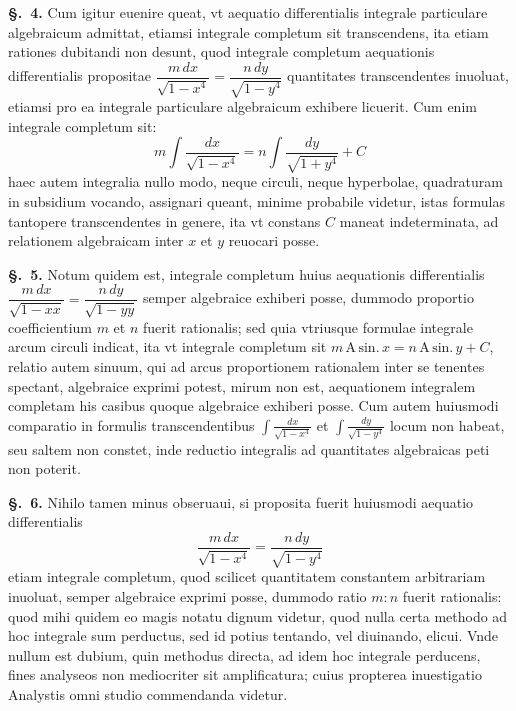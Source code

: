 \documentclass{article}
\begin{document}
\textbf{§.~4.} Cum igitur euenire queat, vt aequatio differentialis integrale particulare
algebraicum admittat, etiamsi integrale completum sit transcendens, ita etiam rationes dubitandi
non desunt, quod integrale completum aequationis differentialis propositae
$\dfrac{m\,dx}{\sqrt{1-x^{4}}} = \dfrac{n\,dy}{\sqrt{1-y^{4}}}$ quantitates transcendentes inuoluat,
etiamsi pro ea integrale particulare algebraicum exhibere licuerit. Cum enim integrale completum
sit:
\[ m\int \frac{dx}{\sqrt{1-x^{4}}} = n\int \frac{dy}{\sqrt{1+y^{4}}} + C \]
haec autem integralia nullo modo, neque circuli, neque hyperbolae, quadraturam in subsidium
vocando, assignari queant, minime probabile videtur, istas formulas tantopere transcendentes in
genere, ita vt constans $C$ maneat indeterminata, ad relationem algebraicam inter $x$ et $y$
reuocari posse.

\textbf{§.~5.} Notum quidem est, integrale completum huius aequationis differentialis
$\dfrac{m\,dx}{\sqrt{1-xx}} = \dfrac{n\,dy}{\sqrt{1-yy}}$ semper algebraice exhiberi posse, dummodo
proportio coefficientium $m$ et $n$ fuerit rationalis; sed quia vtriusque formulae integrale arcum
circuli indicat, ita vt integrale completum sit
$m\,\mathrm{A}\,\mathrm{sin.}\,x = n\,\mathrm{A}\,\mathrm{sin.}\,y + C$, relatio autem sinuum, qui ad
arcus proportionem rationalem inter se tenentes spectant, algebraice exprimi potest, mirum non est,
aequationem integralem completam his casibus quoque algebraice exhiberi posse. Cum autem huiusmodi
comparatio in formulis transcendentibus $\displaystyle\int \frac{dx}{\sqrt{1-x^{4}}}$ et
$\displaystyle\int \frac{dy}{\sqrt{1-y^{4}}}$ locum non habeat, seu saltem non
constet, inde reductio integralis ad quantitates algebraicas peti non poterit.

\textbf{§.~6.} Nihilo tamen minus obseruaui, si proposita fuerit huiusmodi aequatio
differentialis
\[ \frac{m\,dx}{\sqrt{1-x^{4}}} = \frac{n\,dy}{\sqrt{1-y^{4}}} \]
etiam integrale completum, quod scilicet quantitatem constantem arbitrariam inuoluat, semper
algebraice exprimi posse, dummodo ratio $m:n$ fuerit rationalis: quod mihi quidem eo magis notatu
dignum videtur, quod nulla certa methodo ad hoc integrale sum perductus, sed id potius tentando,
vel diuinando, elicui. Vnde nullum est dubium, quin methodus directa, ad idem hoc integrale
perducens, fines analyseos non mediocriter sit amplificatura; cuius propterea inuestigatio
Analystis omni studio commendanda videtur.
\end{document}
